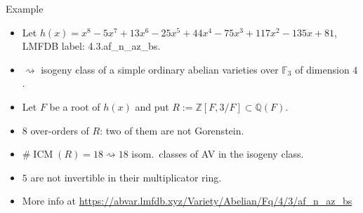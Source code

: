\documentclass[usenames,dvipsnames,handout]{beamer}
\def\Q{\mathbb{Q}}
\def\Z{\mathbb{Z}}
\def\F{\mathbb{F}}
\DeclareMathOperator{\ICM}{ICM}
\begin{document}
\begin{frame}{Example}
	\begin{itemize}
    \item Let $h(x)=x^8 - 5x^7 + 13x^6 - 25x^5 + 44x^4 - 75x^3 + 117x^2 - 135x + 81$, LMFDB label: 4.3.af\_n\_az\_bs.
\pause
    \item $\rightsquigarrow$ isogeny class of a simple ordinary abelian varieties over $\F_{3}$ of dimension $4$.
\pause
    \item Let $F$ be a root of $h(x)$ and put $R:=\Z[F,3/F]\subset \Q(F)$.
\pause
    \item $8$ over-orders of $R$: two of them are not Gorenstein.
\pause
    \item $\#\ICM(R) = 18 \rightsquigarrow 18$ isom.~classes of AV in the isogeny class.
\pause
    \item $5$ are not invertible in their multiplicator ring.
\pause
    \item More info at {\footnotesize \url{https://abvar.lmfdb.xyz/Variety/Abelian/Fq/4/3/af_n_az_bs}}
	\end{itemize}
\end{frame}
\end{document}
